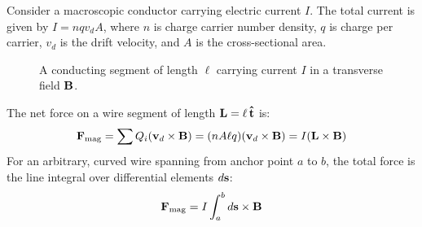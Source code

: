 Consider a macroscopic conductor carrying electric current $I$. The total current is given by $I = n q v_d A$, where $n$ is charge carrier number density, $q$ is charge per carrier, $v_d$ is the drift velocity, and $A$ is the cross-sectional area.

\begin{figure}[htbp]
    \centering
    \caption{A conducting segment of length $\ell$ carrying current $I$ in a transverse field $\vb{B}$.}
    \label{fig:wire_segment_force}
\end{figure}

The net force on a wire segment of length $\vb{L} = \ell\,\vu{t}$ is:
\begin{equation}
    \vb{F}_{\mathrm{mag}} = \sum Q_i (\vb{v}_d \times \vb{B}) = (n A \ell q) (\vb{v}_d \times \vb{B}) = I(\vb{L} \times \vb{B})
\end{equation}
For an arbitrary, curved wire spanning from anchor point $a$ to $b$, the total force is the line integral over differential elements $d\vb{s}$:
\begin{equation}
    \vb{F}_{\mathrm{mag}} = I \int_{a}^{b} d\vb{s} \times \vb{B}
    \label{eq:force_wire_integral}
\end{equation}

